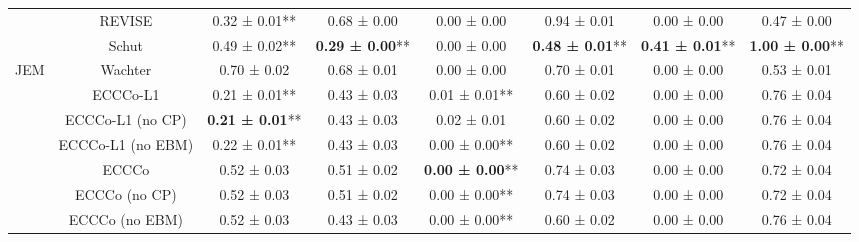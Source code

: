 \begin{table}
{\begin{tabular}[t]{cccccccc}
 & REVISE & 0.32 ± 0.01** & 0.68 ± 0.00\hphantom{*}\hphantom{*} & 0.00 ± 0.00\hphantom{*}\hphantom{*} & 0.94 ± 0.01\hphantom{*}\hphantom{*} & 0.00 ± 0.00\hphantom{*}\hphantom{*} & 0.47 ± 0.00\hphantom{*}\hphantom{*}\\

 & Schut & 0.49 ± 0.02** & \textbf{0.29 ± 0.00}** & 0.00 ± 0.00\hphantom{*}\hphantom{*} & \textbf{0.48 ± 0.01}** & \textbf{0.41 ± 0.01}** & \textbf{1.00 ± 0.00}**\\

\multirow[t]{-9}{*}{\centering\arraybackslash JEM} & Wachter & 0.70 ± 0.02\hphantom{*}\hphantom{*} & 0.68 ± 0.01\hphantom{*}\hphantom{*} & 0.00 ± 0.00\hphantom{*}\hphantom{*} & 0.70 ± 0.01\hphantom{*}\hphantom{*} & 0.00 ± 0.00\hphantom{*}\hphantom{*} & 0.53 ± 0.01\hphantom{*}\hphantom{*}\\
\cmidrule{1-8}
 & ECCCo-L1 & 0.21 ± 0.01** & 0.43 ± 0.03\hphantom{*}\hphantom{*} & 0.01 ± 0.01** & 0.60 ± 0.02\hphantom{*}\hphantom{*} & 0.00 ± 0.00\hphantom{*}\hphantom{*} & 0.76 ± 0.04\hphantom{*}\hphantom{*}\\

 & ECCCo-L1 (no CP) & \textbf{0.21 ± 0.01}** & 0.43 ± 0.03\hphantom{*}\hphantom{*} & 0.02 ± 0.01\hphantom{*}\hphantom{*} & 0.60 ± 0.02\hphantom{*}\hphantom{*} & 0.00 ± 0.00\hphantom{*}\hphantom{*} & 0.76 ± 0.04\hphantom{*}\hphantom{*}\\

 & ECCCo-L1 (no EBM) & 0.22 ± 0.01** & 0.43 ± 0.03\hphantom{*}\hphantom{*} & 0.00 ± 0.00** & 0.60 ± 0.02\hphantom{*}\hphantom{*} & 0.00 ± 0.00\hphantom{*}\hphantom{*} & 0.76 ± 0.04\hphantom{*}\hphantom{*}\\

 & ECCCo & 0.52 ± 0.03\hphantom{*}\hphantom{*} & 0.51 ± 0.02\hphantom{*}\hphantom{*} & \textbf{0.00 ± 0.00}** & 0.74 ± 0.03\hphantom{*}\hphantom{*} & 0.00 ± 0.00\hphantom{*}\hphantom{*} & 0.72 ± 0.04\hphantom{*}\hphantom{*}\\

 & ECCCo (no CP) & 0.52 ± 0.03\hphantom{*}\hphantom{*} & 0.51 ± 0.02\hphantom{*}\hphantom{*} & 0.00 ± 0.00** & 0.74 ± 0.03\hphantom{*}\hphantom{*} & 0.00 ± 0.00\hphantom{*}\hphantom{*} & 0.72 ± 0.04\hphantom{*}\hphantom{*}\\

 & ECCCo (no EBM) & 0.52 ± 0.03\hphantom{*}\hphantom{*} & 0.43 ± 0.03\hphantom{*}\hphantom{*} & 0.00 ± 0.00** & 0.60 ± 0.02\hphantom{*}\hphantom{*} & 0.00 ± 0.00\hphantom{*}\hphantom{*} & 0.76 ± 0.04\hphantom{*}\hphantom{*}\\


\end{tabular}}
\end{table}
